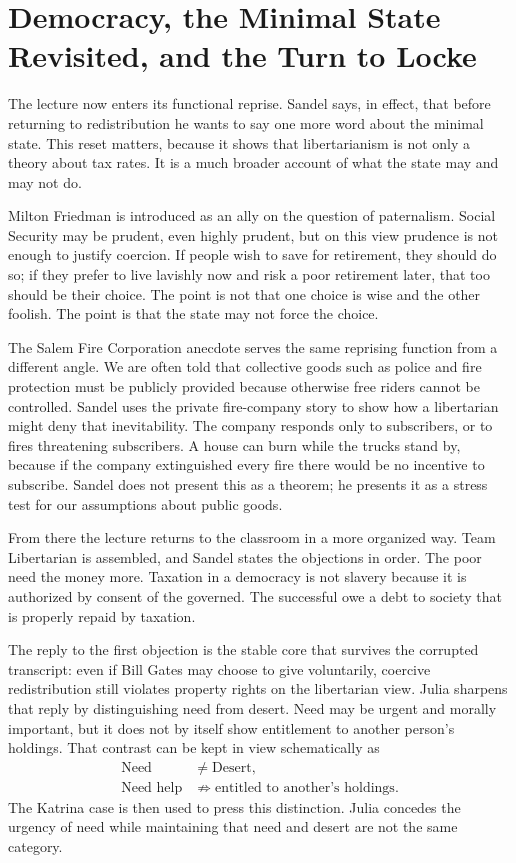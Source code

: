 \section{Democracy, the Minimal State Revisited, and the Turn to Locke}

The lecture now enters its functional reprise. Sandel says, in effect, that before returning to redistribution he wants to say one more word about the minimal state. This reset matters, because it shows that libertarianism is not only a theory about tax rates. It is a much broader account of what the state may and may not do.

Milton Friedman is introduced as an ally on the question of paternalism. Social Security may be prudent, even highly prudent, but on this view prudence is not enough to justify coercion. If people wish to save for retirement, they should do so; if they prefer to live lavishly now and risk a poor retirement later, that too should be their choice. The point is not that one choice is wise and the other foolish. The point is that the state may not force the choice.

The Salem Fire Corporation anecdote serves the same reprising function from a different angle. We are often told that collective goods such as police and fire protection must be publicly provided because otherwise free riders cannot be controlled. Sandel uses the private fire-company story to show how a libertarian might deny that inevitability. The company responds only to subscribers, or to fires threatening subscribers. A house can burn while the trucks stand by, because if the company extinguished every fire there would be no incentive to subscribe. Sandel does not present this as a theorem; he presents it as a stress test for our assumptions about public goods.

From there the lecture returns to the classroom in a more organized way. Team Libertarian is assembled, and Sandel states the objections in order. The poor need the money more. Taxation in a democracy is not slavery because it is authorized by consent of the governed. The successful owe a debt to society that is properly repaid by taxation.

The reply to the first objection is the stable core that survives the corrupted transcript: even if Bill Gates may choose to give voluntarily, coercive redistribution still violates property rights on the libertarian view. Julia sharpens that reply by distinguishing need from desert. Need may be urgent and morally important, but it does not by itself show entitlement to another person's holdings. That contrast can be kept in view schematically as
\begin{align}
\text{Need} &\neq \text{Desert}, \\
\text{Need help} &\not\Longrightarrow \text{entitled to another's holdings}.
\end{align}
The Katrina case is then used to press this distinction. Julia concedes the urgency of need while maintaining that need and desert are not the same category.

